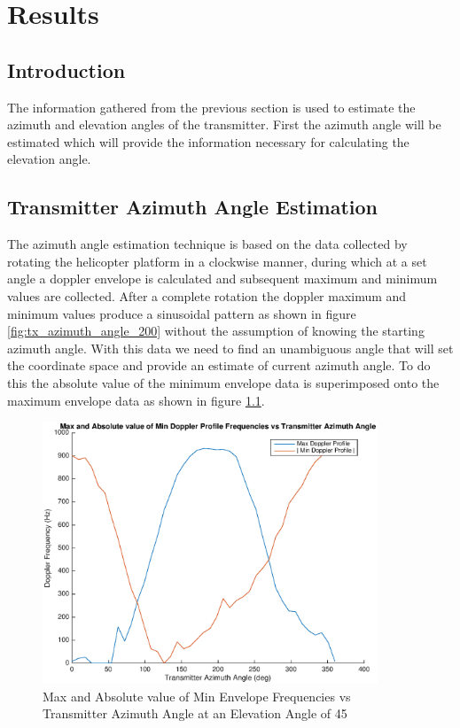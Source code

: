 \chapter{Results}

\section{Introduction}
The information gathered from the previous section is used to estimate the azimuth and elevation angles of the transmitter. First the azimuth angle will be estimated which will provide the information necessary for calculating the elevation angle. 


\section{Transmitter Azimuth Angle Estimation}
The azimuth angle estimation technique is based on the data collected by rotating the helicopter platform in a clockwise manner, during which at a set angle a doppler envelope is calculated and subsequent maximum and minimum values are collected. After a complete rotation the doppler maximum and minimum values produce a sinusoidal pattern as shown in figure \ref{fig:tx_azimuth_angle_200} without the assumption of knowing the starting azimuth angle. With this data we need to find an unambiguous angle that will set the coordinate space and provide an estimate of current azimuth angle. To do this the absolute value of the minimum envelope data is superimposed onto the maximum envelope data as shown in figure \ref{fig:azimuth_estimation_max_vs_absMin}.

\begin{figure}
	\begin{center}
		\includegraphics[width=10cm]{images/results/Azimuth_angle_estimation_max_vs_absMin.eps}
		\caption{Max and Absolute value of Min Envelope Frequencies vs Transmitter Azimuth Angle at an Elevation Angle of 45\textdegree}
		\label{fig:azimuth_estimation_max_vs_absMin}
	\end{center}
\end{figure}

